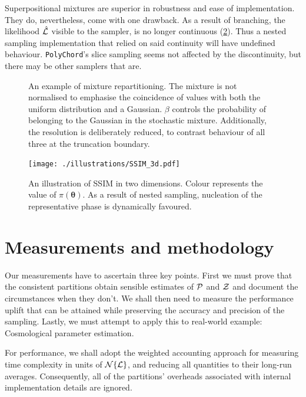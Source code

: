 \documentclass[usenatbib]{mnras}
\begin{document}
Superpositional mixtures are superior in robustness and ease of
implementation. They do, nevertheless, come with one drawback. As a
result of branching, the likelihood $\hat{\cal L}$ visible to the
sampler, is no longer continuous (\cref{fig:mixture-3d}). Thus a
nested sampling implementation that relied on said continuity will
have undefined behaviour. \texttt{PolyChord}'s slice sampling seems
not affected by the discontinuity, but there may be other samplers
that are.
\begin{figure}  
  

  

  
  \caption{An example of mixture repartitioning. The mixture is not
    normalised to emphasise the coincidence of values with both the
    uniform distribution and a Gaussian. $\beta$ controls the
    probability of belonging to the Gaussian in the stochastic
    mixture.  Additionally, the resolution is deliberately reduced, to
    contrast behaviour of all three at the truncation
    boundary. \label{fig:mixture}}
\end{figure}

\begin{figure}
  \centering
  \texttt{[image: ./illustrations/SSIM\_3d.pdf]}
  \caption{An illustration of SSIM in two dimensions. Colour represents the value of $\pi(\bm{\theta})$. As a result of nested sampling, nucleation of the representative phase is dynamically favoured.}
  \label{fig:mixture-3d}
\end{figure}


\section{Measurements and methodology}
Our measurements have to ascertain three key points. First we must
prove that the consistent partitions obtain sensible estimates of
${\cal P}$ and ${\cal Z}$ and document the circumstances when they
don't. We shall then need to measure the performance uplift that can
be attained while preserving the accuracy and precision of the
sampling. Lastly, we must attempt to apply this to real-world example:
Cosmological parameter estimation. 

For performance, we shall adopt the weighted accounting approach
\citep{Cormen} for measuring time complexity in units of
\({\cal N}\{{\cal L}\}\), and reducing all quantities to their
long-run averages. Consequently, all of the partitions' overheads
associated with internal implementation details are ignored.
\end{document}
